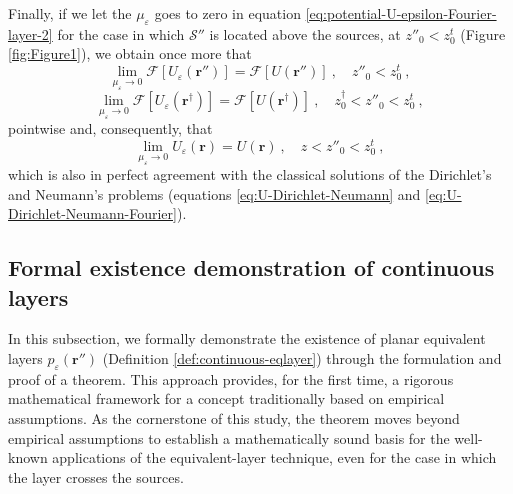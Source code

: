 \documentclass[manuscript,noblind]{geophysics}
\begin{document}
	Finally, if we let the $\mu_{\varepsilon}$ 
	goes to zero in equation \ref{eq:potential-U-epsilon-Fourier-layer-2} for the case in which 
	$\mathcal{S}''$ is located above the sources, at $z''_{0} < z^{t}_{0}$ (Figure \ref{fig:Figure1}), 
	we obtain once more that 
	\begin{equation}
		\lim_{\mu_{\varepsilon}\to 0} \mathcal{F} \left[ U_{\varepsilon}(\mathbf{r}'') \right] = 
		\mathcal{F} \left[ U(\mathbf{r}'') \right] \: , \quad z''_{0} < z^{t}_{0} \: ,
		\label{eq:lim-muepsilon-potential-U-epsilon-Fourier-layer}
	\end{equation}
	\begin{equation}
		\lim_{\mu_{\varepsilon}\to 0} \mathcal{F} \left[ U_{\varepsilon}(\mathbf{r}^{\dagger}) \right] = 
		\mathcal{F} \left[ U(\mathbf{r}^{\dagger}) \right] \: , \quad z^{\dagger}_{0} < z''_{0} < z^{t}_{0} \: ,
		\label{eq:lim-muepsilon-potential-U-epsilon-Fourier-dagger}
	\end{equation}
	pointwise and, consequently, that
	\begin{equation}
		\lim_{\mu_{\varepsilon}\to 0} U_{\varepsilon}(\mathbf{r}) = 
		U(\mathbf{r}) \: , \quad z < z''_{0} < z^{t}_{0} \: ,
		\label{eq:lim-muepsilon-potential-U-epsilon-space}
	\end{equation}
	which is also in perfect agreement with the classical solutions of the Dirichlet's and Neumann's
	problems (equations \ref{eq:U-Dirichlet-Neumann} and \ref{eq:U-Dirichlet-Neumann-Fourier}).
	
	\subsection{Formal existence demonstration of continuous layers}
	
	In this subsection, we formally demonstrate the existence of planar equivalent layers 
	$p_{\varepsilon}(\mathbf{r}'')$ (Definition \ref{def:continuous-eqlayer}) 
	through the formulation and proof of a theorem. This approach provides, for the first time, a rigorous mathematical 
	framework for a concept traditionally based on empirical assumptions.
	As the cornerstone of this study, the theorem moves beyond empirical assumptions to establish 
	a mathematically sound basis for the well-known applications of the equivalent-layer technique, 
	even for the case in which the layer crosses the sources.
	
\end{document}
